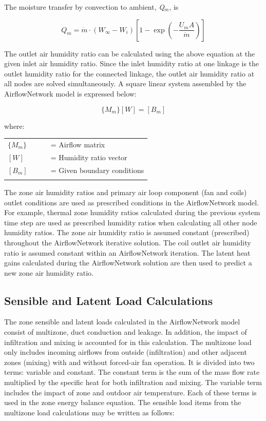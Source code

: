The moisture transfer by convection to ambient, \emph{Q\(_{m}\)}, is

\begin{equation}
Q_m = \dot{m} \cdot (W_\infty - W_i)\left[ 1 - \exp \left(- \frac{U_m A}{\dot{m}} \right) \right]
\end{equation}

The outlet air humidity ratio can be calculated using the above equation at the given inlet air humidity ratio. Since the inlet humidity ratio at one linkage is the outlet humidity ratio for the connected linkage, the outlet air humidity ratio at all nodes are solved simultaneously. A square linear system assembled by the AirflowNetwork model is expressed below:

\begin{equation}
\{M_m\} [W] = [B_m]
\end{equation}

where:
\begin{tabular}{lp{0.7\linewidth}}
\\
$\{M_m\}$ &= Airflow matrix\\
$[W]$ &= Humidity ratio vector\\
$[B_m]$ &= Given boundary conditions\\
\\
\end{tabular}

The zone air humidity ratios and primary air loop component (fan and coils) outlet conditions are used as prescribed conditions in the AirflowNetwork model. For example, thermal zone humidity ratios calculated during the previous system time step are used as prescribed humidity ratios when calculating all other node humidity ratios. The zone air humidity ratio is assumed constant (prescribed) throughout the AirflowNetwork iterative solution. The coil outlet air humidity ratio is assumed constant within an AirflowNetwork iteration. The latent heat gains calculated during the AirflowNetwork solution are then used to predict a new zone air humidity ratio.

\subsection{Sensible and Latent Load Calculations}\label{sensible-and-latent-load-calculations}

The zone sensible and latent loads calculated in the AirflowNetwork model consist of multizone, duct conduction and leakage. In addition, the impact of infiltration and mixing is accounted for in this calculation. The multizone load only includes incoming airflows from outside (infiltration) and other adjacent zones (mixing) with and without forced-air fan operation. It is divided into two terms: variable and constant. The constant term is the sum of the mass flow rate multiplied by the specific heat for both infiltration and mixing. The variable term includes the impact of zone and outdoor air temperature. Each of these terms is used in the zone energy balance equation. The sensible load items from the multizone load calculations may be written as follows:

